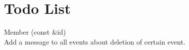 \chapter{Todo List}
\hypertarget{todo}{}\label{todo}

\begin{DoxyRefList}
\item[Member \doxylink{class_event_manager_a2cebf687c3c194179d590d581c56dbe2}{Event\+Manager\+::kill\+\_\+event} (const \doxylink{class_event_id}{Event\+Id} \&id)]\hfill \\
\label{todo__todo000001}%
%
Add a message to all events about deletion of certain event. 
\end{DoxyRefList}